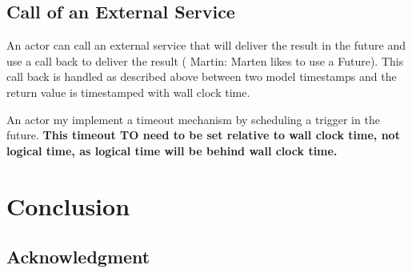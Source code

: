 \documentclass[sigconf]{acmart}
\newcommand{\martin}[1]{{\color{blue} Martin: #1}}
\begin{document}
\subsection{Call of an External Service}

An actor can call an external service that will deliver the result in the future
and use a call back to deliver the result (\martin{Marten likes to use a Future}).
This call back is handled as described above between two model timestamps
and the return value is timestamped with wall clock time.

An actor my implement a timeout mechanism by scheduling a trigger in the future.
{\bf This timeout TO need to be set relative to wall clock time, not logical
time, as logical time will be behind wall clock time.}



\section{Conclusion}
\label{sec:conclusion}


\subsection*{Acknowledgment}



 
\end{document}
